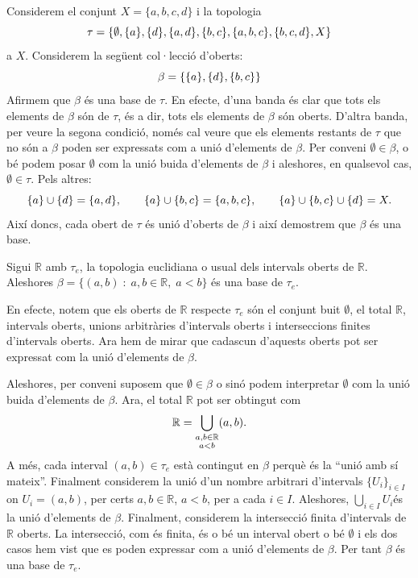 \documentclass[../main.tex]{subfiles}
\begin{document}
\begin{ej}
\label{ej:base2} Considerem el conjunt $X = \{a,b,c,d\}$ i la topologia 
\begin{equation}
    \notag
    \tau = \{\emptyset,\{a\},\{d\},\{a,d\},\{b,c\},\{a,b,c\},\{b,c,d\},X\}
\end{equation}
a $X$. Considerem la següent col·lecció d'oberts:
\begin{equation}
    \notag
    \beta = \{\{a\},\{d\},\{b,c\}\}
\end{equation}
Afirmem que $\beta$ és una base de $\tau$. En efecte, d'una banda és clar que tots els elements de $\beta$ són de $\tau$, és a dir, tots els elements de $\beta$ són oberts. D'altra banda, per veure la segona condició, només cal veure que els elements restants de $\tau$ que no són a $\beta$ poden ser expressats com a unió d'elements de $\beta$. Per conveni $\emptyset\in\beta$, o bé podem posar $\emptyset$ com la unió buida d'elements de $\beta$ i aleshores, en qualsevol cas, $\emptyset\in\tau$. Pels altres:
\begin{equation}
    \notag
    \{a\}\cup\{d\} = \{a,d\},\qquad \{a\}\cup\{b,c\} = \{a,b,c\},\qquad \{a\}\cup\{b,c\}\cup\{d\} = X.
\end{equation}
Així doncs, cada obert de $\tau$ és unió d'oberts de $\beta$ i així demostrem que $\beta$ és una base.
\end{ej}

\begin{ej}
\label{ej:base3} Sigui $\mathbb{R}$ amb $\tau_e$, la topologia euclidiana o usual dels intervals oberts de $\mathbb{R}$. Aleshores $\beta = \{(a,b)\;:\;a,b\in\mathbb{R},\;a<b\}$ és una base de $\tau_e$.

En efecte, notem que els oberts de $\mathbb{R}$ respecte $\tau_e$ són el conjunt buit $\emptyset$, el total $\mathbb{R}$, intervals oberts, unions arbitràries d'intervals oberts i interseccions finites d'intervals oberts. Ara hem de mirar que cadascun d'aquests oberts pot ser expressat com la unió d'elements de $\beta$. 

Aleshores, per conveni suposem que $\emptyset\in\beta$ o sinó podem interpretar $\emptyset$ com la unió buida d'elements de $\beta$. Ara, el total $\mathbb{R}$ pot ser obtingut com
\begin{equation}
    \notag
    \mathbb{R} = \bigcup_{\substack{a,b\in\mathbb{R}\\a<b}} (a,b).
\end{equation}
A més, cada interval $(a,b)\in\tau_e$ està contingut en $\beta$ perquè és la ``unió amb sí mateix''. Finalment considerem la unió d'un nombre arbitrari d'intervals $\{U_i\}_{i\in I}$ on $U_i = (a,b)$, per certs $a,b\in\mathbb{R}$, $a<b$, per a cada $i\in I$. Aleshores, $\bigcup_{i\in I} U_i$és la unió d'elements de $\beta$. Finalment, considerem la intersecció finita d'intervals de $\mathbb{R}$ oberts. La intersecció, com és finita, és o bé un interval obert o bé $\emptyset$ i els dos casos hem vist que es poden expressar com a unió d'elements de $\beta$. Per tant $\beta$ és una base de $\tau_e$.
\end{ej}
\end{document}
